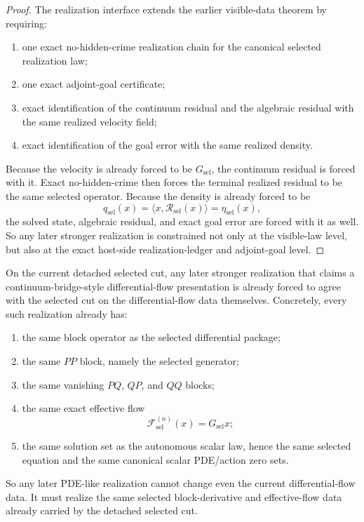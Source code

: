 \begin{proof}
The realization interface extends the earlier visible-data theorem by
requiring:
\begin{enumerate}
\item one exact no-hidden-crime realization chain for the canonical selected
      realization law;
\item one exact adjoint-goal certificate;
\item exact identification of the continuum residual and the algebraic
      residual with the same realized velocity field;
\item exact identification of the goal error with the same realized
      density.
\end{enumerate}
Because the velocity is already forced to be \(G_{\mathrm{sel}}\), the
continuum residual is forced with it. Exact no-hidden-crime then forces the
terminal realized residual to be the same selected operator. Because the
density is already forced to be
\[
q_{\mathrm{sel}}(x)
 =\langle x,\mathcal R_{\mathrm{sel}}(x)\rangle
 =\eta_{\mathrm{sel}}(x),
\]
the solved state, algebraic residual, and exact goal error are forced with it
as well. So any later stronger realization is constrained not only at the
visible-law level, but also at the exact host-side realization-ledger and
adjoint-goal level.
\end{proof}

\begin{theorem}
\label{thm:the-selected-cut-already-fixes-the-differential-flow-contract-for-any-later-stronger-flagship-realization}
On the current detached selected cut, any later stronger realization
that claims a continuum-bridge-style differential-flow presentation is already forced
to agree with the selected cut on the differential-flow data themselves.
Concretely, every such realization already has:
\begin{enumerate}
\item the same block operator as the selected differential package;
\item the same \(PP\) block, namely the selected generator;
\item the same vanishing \(PQ\), \(QP\), and \(QQ\) blocks;
\item the same exact effective flow
\[
\mathcal F_{\mathrm{sel}}^{(n)}(x)=G_{\mathrm{sel}}x;
\]
\item the same solution set as the autonomous scalar law, hence the same
      selected equation and the same canonical scalar PDE/action zero sets.
\end{enumerate}
So any later PDE-like realization cannot change even the current
differential-flow data. It must realize the same selected block-derivative
and effective-flow data already carried by the detached selected cut.
\end{theorem}

